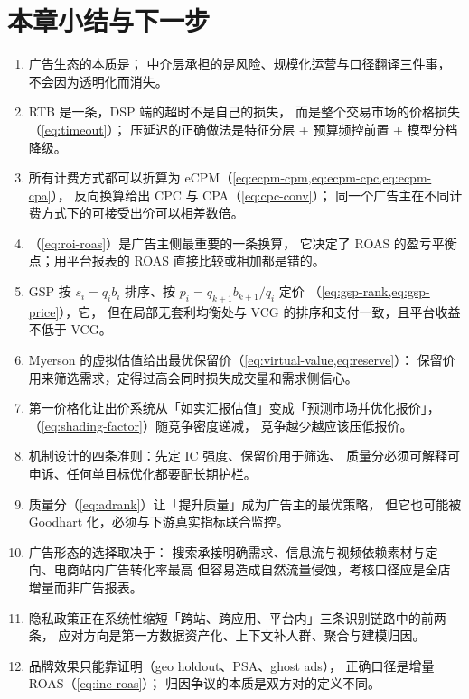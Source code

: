 \section{本章小结与下一步}

\begin{keypoint}[本章要点回顾]
\begin{enumerate}
  \item 广告生态的本质是；
        中介层承担的是风险、规模化运营与口径翻译三件事，不会因为透明化而消失。
  \item RTB 是一条，DSP 端的超时不是自己的损失，
        而是整个交易市场的价格损失（\cref{eq:timeout}）；
        压延迟的正确做法是特征分层 + 预算频控前置 + 模型分档降级。
  \item 所有计费方式都可以折算为 eCPM（\cref{eq:ecpm-cpm,eq:ecpm-cpc,eq:ecpm-cpa}），
        反向换算给出 CPC 与 CPA（\cref{eq:cpc-conv}）；
        同一个广告主在不同计费方式下的可接受出价可以相差数倍。
  \item {}（\cref{eq:roi-roas}）是广告主侧最重要的一条换算，
        它决定了 ROAS 的盈亏平衡点；用平台报表的 ROAS 直接比较或相加都是错的。
  \item GSP 按 $s_i = q_i b_i$ 排序、按 $p_i = q_{k+1} b_{k+1} / q_i$ 定价
        （\cref{eq:gsp-rank,eq:gsp-price}），它，
        但在局部无套利均衡处与 VCG 的排序和支付一致，且平台收益不低于 VCG。
  \item Myerson 的虚拟估值给出最优保留价（\cref{eq:virtual-value,eq:reserve}）：
        保留价用来筛选需求，定得过高会同时损失成交量和需求侧信心。
  \item 第一价格化让出价系统从「如实汇报估值」变成「预测市场并优化报价」，
        （\cref{eq:shading-factor}）随竞争密度递减，
        竞争越少越应该压低报价。
  \item 机制设计的四条准则：先定 IC 强度、保留价用于筛选、
        质量分必须可解释可申诉、任何单目标优化都要配长期护栏。
  \item 质量分（\cref{eq:adrank}）让「提升质量」成为广告主的最优策略，
        但它也可能被 Goodhart 化，必须与下游真实指标联合监控。
  \item 广告形态的选择取决于：
        搜索承接明确需求、信息流与视频依赖素材与定向、电商站内广告转化率最高
        但容易造成自然流量侵蚀，考核口径应是全店增量而非广告报表。
  \item 隐私政策正在系统性缩短「跨站、跨应用、平台内」三条识别链路中的前两条，
        应对方向是第一方数据资产化、上下文补人群、聚合与建模归因。
  \item 品牌效果只能靠证明（geo holdout、PSA、ghost ads），
        正确口径是增量 ROAS（\cref{eq:inc-roas}）；
        归因争议的本质是双方对的定义不同。
\end{enumerate}
\end{keypoint}

